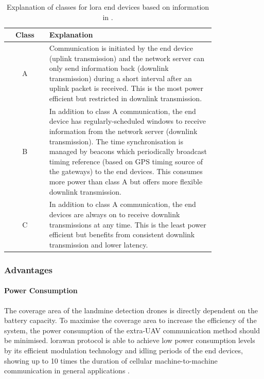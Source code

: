 \begin{table}[h!]
    \centering
    \begin{tabular}{|c|p{0.8\linewidth}|}
    \hline
        \textbf{Class} & \textbf{Explanation} \\
    \hline\hline
        A & Communication is initiated by the end device (uplink transmission) and the network server can only send information back (downlink transmission) during a short interval after an uplink packet is received. This is the most power efficient but restricted in downlink transmission. \\
    \hline
        B & In addition to class A communication, the end device has regularly-scheduled windows to receive information from the network server (downlink transmission). The time synchronisation is managed by beacons which periodically broadcast timing reference (based on GPS timing source of the gateways) to the end devices. This consumes more power than class A but offers more flexible downlink transmission. \\
    \hline
        C & In addition to class A communication, the end devices are always on to receive downlink transmissions at any time. This is the least power efficient but benefits from consistent downlink transmission and lower latency. \\
    \hline
    \end{tabular}
    \caption[Explanation of Classes for LoRa End Devices]
    {Explanation of classes for \gls{lora} end devices based on information in \cite{semtech2024lora}.}
    \label{tab:euc_loraclasses}
\end{table}

\subsubsection{Advantages}

\paragraph{Power Consumption} The coverage area of the landmine detection drones is directly dependent on the battery capacity. To maximise the coverage area to increase the efficiency of the system, the power consumption of the extra-\gls{UAV} communication method should be minimised. \gls{lorawan} protocol is able to achieve low power consumption levels by its efficient modulation technology and idling periods of the end devices, showing up to 10 times the duration of cellular machine-to-machine communication in general applications \cite{semtech2024lora}. 

